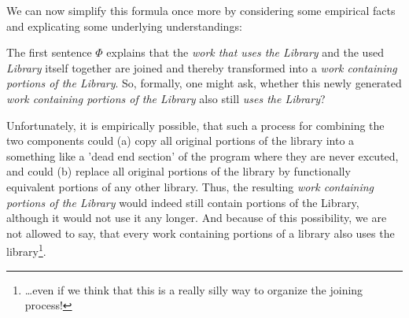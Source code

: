 %
%
%
%
%

We can now simplify this formula once more by considering some empirical facts
and explicating some underlying understandings:

The first sentence $\Phi$ explains that the \emph{work that uses the Library}
and the used \emph{Library} itself together are joined and thereby transformed
into a \emph{work containing portions of the Library}. So, formally, one might
ask, whether this newly generated \emph{work containing portions of the Library}
also still \emph{uses the Library}?

Unfortunately, it is empirically possible, that such a process for combining the
two components could (a) copy all original portions of the library into a
something like a 'dead end section' of the program where they are never excuted,
and could (b) replace all original portions of the library by functionally
equivalent portions of any other library. Thus, the resulting \emph{work
containing portions of the Library} would indeed still contain portions of the
Library, although it would not use it any longer. And because of this
possibility, we are not allowed to say, that every work containing portions of a
library also uses the library\footnote{\ldots even if we think that this is a
really silly way to organize the joining process!}.

